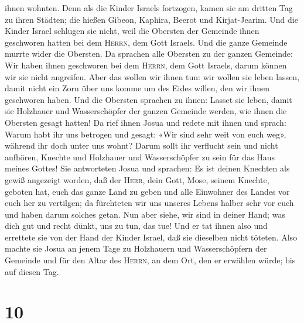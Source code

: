 ihnen wohnten.  Denn als die Kinder Israels fortzogen,
kamen sie am dritten Tag zu ihren Städten; die hießen Gibeon, Kaphira,
Beerot und Kirjat-Jearim.  Und die Kinder Israel schlugen
sie nicht, weil die Obersten der Gemeinde ihnen geschworen hatten bei
dem \textsc{Herrn}, dem Gott Israels. Und die ganze Gemeinde murrte
wider die Obersten.  Da sprachen alle Obersten zu der
ganzen Gemeinde: Wir haben ihnen geschworen bei dem \textsc{Herrn}, dem
Gott Israels, darum können wir sie nicht angreifen.  Aber
das wollen wir ihnen tun: wir wollen sie leben lassen, damit nicht ein
Zorn über uns komme um des Eides willen, den wir ihnen geschworen haben.
 Und die Obersten sprachen zu ihnen: Lasset sie leben,
damit sie Holzhauer und Wasserschöpfer der ganzen Gemeinde werden, wie
ihnen die Obersten gesagt hatten!  Da rief ihnen Josua
und redete mit ihnen und sprach: Warum habt ihr uns betrogen und gesagt:
«Wir sind sehr weit von euch weg», während ihr doch unter uns wohnt?
 Darum sollt ihr verflucht sein und nicht aufhören,
Knechte und Holzhauer und Wasserschöpfer zu sein für das Haus meines
Gottes!  Sie antworteten Josua und sprachen: Es ist
deinen Knechten als gewiß angezeigt worden, daß der \textsc{Herr}, dein
Gott, Mose, seinem Knechte, geboten hat, euch das ganze Land zu geben
und alle Einwohner des Landes vor euch her zu vertilgen; da fürchteten
wir uns unseres Lebens halber sehr vor euch und haben darum solches
getan.  Nun aber siehe, wir sind in deiner Hand; was dich
gut und recht dünkt, uns zu tun, das tue!  Und er tat
ihnen also und errettete sie von der Hand der Kinder Israel, daß sie
dieselben nicht töteten.  Also machte sie Josua an jenem
Tage zu Holzhauern und Wasserschöpfern der Gemeinde und für den Altar
des \textsc{Herrn}, an dem Ort, den er erwählen würde; bis auf diesen
Tag.

\hypertarget{section-9}{%
\section{10}\label{section-9}}

